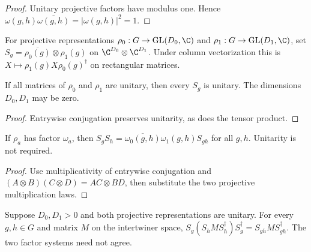 \begin{proof}\leanok
    Unitary projective factors have modulus one. Hence
    $\omega(g,h)\overline{\omega(g,h)}=|\omega(g,h)|^2=1$.
\end{proof}

\begin{definition}
    \label{def:spc_aux_projective_hom_action}
    \leanok
    For projective representations $\rho_0:G\to\mathrm{GL}(D_0,\C)$
    and $\rho_1:G\to\mathrm{GL}(D_1,\C)$, set
    $S_g=\overline{\rho_0(g)}\otimes\rho_1(g)$ on
    $\C^{D_0}\otimes\C^{D_1}$. Under column vectorization this is
    $X\mapsto\rho_1(g)X\rho_0(g)^\dagger$ on rectangular matrices.
\end{definition}

\begin{lemma}
    \label{thm:spc_aux_projective_hom_unitary}
    \leanok
    If all matrices of $\rho_0$ and $\rho_1$ are unitary, then every
    $S_g$ is unitary. The dimensions $D_0,D_1$ may be zero.
\end{lemma}

\begin{proof}\leanok
    Entrywise conjugation preserves unitarity, as does the tensor product.
\end{proof}

\begin{lemma}
    \label{thm:spc_aux_projective_hom_product}
    \leanok
    If $\rho_a$ has factor $\omega_a$, then
    $S_gS_h=\overline{\omega_0(g,h)}\omega_1(g,h)S_{gh}$ for all $g,h$.
    Unitarity is not required.
\end{lemma}

\begin{proof}\leanok
    Use multiplicativity of entrywise conjugation and
    $(A\otimes B)(C\otimes D)=AC\otimes BD$, then substitute the two
    projective multiplication laws.
\end{proof}

\begin{lemma}
    \label{thm:spc_aux_projective_hom_conjugation}
    \leanok
    Suppose $D_0,D_1>0$ and both projective representations are unitary.
    For every $g,h\in G$ and matrix $M$ on the intertwiner space,
    $S_g(S_hMS_h^\dagger)S_g^\dagger=S_{gh}MS_{gh}^\dagger$.
    The two factor systems need not agree.
\end{lemma}

